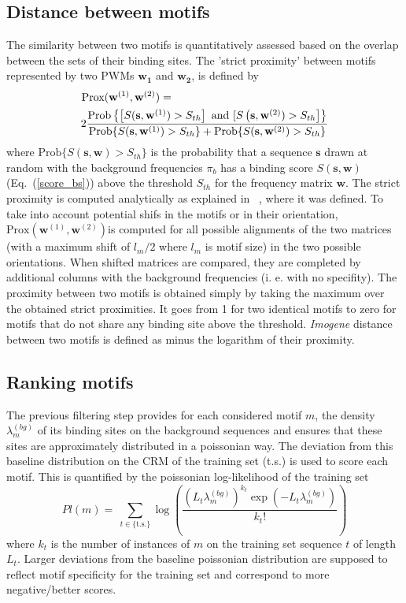 \documentclass[a4,center,fleqn]{NAR}
\begin{document}
\subsection{Distance between motifs}
The similarity between two motifs is quantitatively assessed based on the
overlap between the sets of their binding sites.
The 'strict proximity' between motifs represented
by two PWMs $\mathbf{w_1}$ and $\mathbf{w_2}$,
is defined by
\begin{eqnarray}
   \mathrm{Prox(\mathbf{w}^{(1)},\mathbf{w}^{(2)})}=\hskip5.cm\nonumber\\ 2 \frac{\mathrm{Prob}\left\{\left[S(\mathbf{s},\mathbf{w}^{(1)})>S_{th}\right]\ \textrm{and}\  
[S\left(\mathbf{s},\mathbf{w}^{(2)})> S_{th}\right]\right\}}{\mathrm{Prob}\{S(\mathbf{s},\mathbf{w}^{(1)})
>S_{th}\}+\mathrm{Prob}\{S(\mathbf{s},\mathbf{w}^{(2)})>S_{th}\}}
\label{defprox}
\end{eqnarray}
where $\mathrm{Prob}\{S(\mathbf{s},\mathbf{w})>S_{th}\}$ is the probability
that a sequence $\mathbf{s}$ drawn at random with the background frequencies
$\pi_b$ has a binding score $S(\mathbf{s},\mathbf{w})$ (Eq.~(\ref{score_bs}))
above the threshold $S_{th}$ for the frequency matrix $\mathbf{w}$.  
 The strict proximity is computed analytically as
explained
in ~\cite{Rouault:2010fk}, where it was defined. 
To take into account  potential shifs in the motifs 
or in their orientation, $\mathrm{Prox}(\mathbf{w}^{(1)},\mathbf{w}^{(2)})$is computed for all  possible alignments of the two matrices (with a maximum shift of $l_m/2$ where $l_m$ is motif size) in the two possible orientations. When shifted matrices are
compared, they are completed by  additional columns with the background frequencies (i. e. with no specifity). The proximity between  two motifs is obtained simply by taking the maximum over the obtained strict proximities.
It goes from 1 for two identical motifs to zero for motifs that do not share any binding site above the threshold. {\em Imogene} distance between two motifs is defined as minus the logarithm of their proximity.



\subsection{Ranking motifs}
The previous filtering step provides for each considered motif $m$, the density
$\lambda^{(bg)}_m$ of its binding sites on the background sequences and ensures
that these sites are  approximately distributed in a poissonian way.
The deviation from this baseline distribution on the CRM of the training set
(t.s.) is used to score each motif.
This is quantified by the poissonian log-likelihood of the training set
\begin{equation}
   Pl(m)=\  \sum_{t\in\{\mathrm{t.s.}\}} \log\left(\frac{\left(L_t \lambda^{(bg)}_m\right)^{k_t} \exp(-L_t \lambda^{(bg)}_m)}{k_t!}\right)
   \label{motscore}
\end{equation}
where $k_t$ is the number of instances of $m$ on the training set sequence $t$
of length $L_t$.
Larger deviations from the baseline poissonian distribution are supposed to
reflect motif specificity for the training set and correspond to more
negative/better scores.
\end{document}
